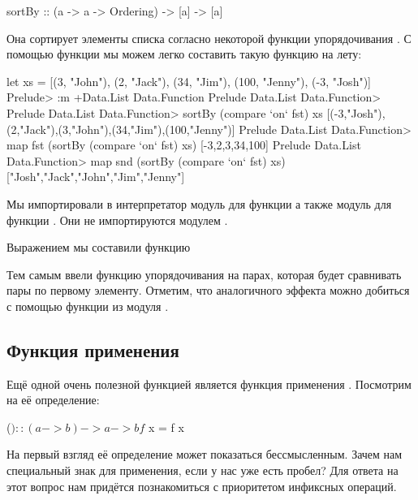 \begin{code}
sortBy :: (a -> a -> Ordering) -> [a] -> [a]
\end{code}

Она сортирует элементы списка согласно некоторой функции упорядочивания
. С помощью функции  мы можем
легко составить такую функцию на лету:


\begin{code}
let xs = [(3, "John"), (2, "Jack"), (34, "Jim"), (100, "Jenny"), (-3, "Josh")]  
Prelude> :m +Data.List Data.Function
Prelude Data.List Data.Function> 
Prelude Data.List Data.Function> sortBy (compare `on` fst) xs
[(-3,"Josh"),(2,"Jack"),(3,"John"),(34,"Jim"),(100,"Jenny")]
Prelude Data.List Data.Function> map fst (sortBy (compare `on` fst) xs)
[-3,2,3,34,100]
Prelude Data.List Data.Function> map snd (sortBy (compare `on` fst) xs)
["Josh","Jack","John","Jim","Jenny"]
\end{code}

Мы импортировали в интерпретатор модуль  для функции
 а также модуль  для функции . Они
не импортируются модулем .

Выражением  мы составили функцию



Тем самым ввели функцию упорядочивания на парах, которая будет
сравнивать пары по первому элементу. Отметим, что аналогичного эффекта
можно добиться с помощью функции  из модуля .

\subsection{Функция применения}

Ещё одной очень полезной функцией является функция применения \In{($)}.
Посмотрим на её определение:


\begin{code}
($) :: (a -> b) -> a -> b
f $ x  =  f x
\end{code}

На первый взгляд её определение может показаться бессмысленным. Зачем
нам специальный знак для применения, если у нас уже есть пробел? Для
ответа на этот вопрос нам придётся познакомиться с приоритетом инфиксных
операций.

